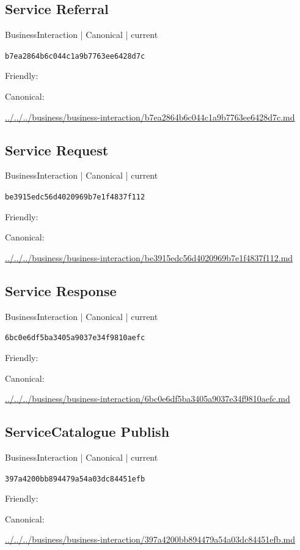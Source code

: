 \documentclass[10pt,a4paper]{article}
\begin{document}
\subsection*{Service Referral}
{\small BusinessInteraction | Canonical | current}\par
\texttt{b7ea2864b6c044c1a9b7763ee6428d7c}\par
Friendly: \par
Canonical: \par
{\footnotesize\url{../../../business/business-interaction/b7ea2864b6c044c1a9b7763ee6428d7c.md}}\par
\subsection*{Service Request}
{\small BusinessInteraction | Canonical | current}\par
\texttt{be3915edc56d4020969b7e1f4837f112}\par
Friendly: \par
Canonical: \par
{\footnotesize\url{../../../business/business-interaction/be3915edc56d4020969b7e1f4837f112.md}}\par
\subsection*{Service Response}
{\small BusinessInteraction | Canonical | current}\par
\texttt{6bc0e6df5ba3405a9037e34f9810aefc}\par
Friendly: \par
Canonical: \par
{\footnotesize\url{../../../business/business-interaction/6bc0e6df5ba3405a9037e34f9810aefc.md}}\par
\subsection*{ServiceCatalogue Publish}
{\small BusinessInteraction | Canonical | current}\par
\texttt{397a4200bb894479a54a03dc84451efb}\par
Friendly: \par
Canonical: \par
{\footnotesize\url{../../../business/business-interaction/397a4200bb894479a54a03dc84451efb.md}}\par
\end{document}

